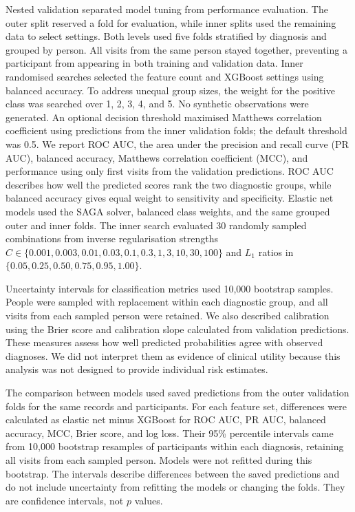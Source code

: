 \documentclass[referee,pdflatex,sn-vancouver-num]{sn-jnl}
\begin{document}
Nested validation separated model tuning from performance evaluation. The
outer split reserved a fold for evaluation, while inner splits used the
remaining data to select settings. Both levels used five folds stratified by
diagnosis and grouped by person. All visits from the same person stayed
together, preventing a participant from appearing in both training and
validation data. Inner randomised searches selected the feature count and
XGBoost settings using balanced accuracy. To address unequal group sizes,
the weight for the positive class was searched over 1, 2, 3, 4, and 5.
No synthetic observations were generated. An optional decision threshold
maximised Matthews correlation coefficient using predictions from the inner
validation folds; the default threshold was 0.5. We report ROC AUC, the area under
the precision and recall curve (PR AUC), balanced accuracy, Matthews correlation coefficient (MCC), and
performance using only first visits from the validation predictions. ROC AUC
describes how well the predicted scores rank the two diagnostic groups, while
balanced accuracy gives equal weight to sensitivity and specificity. Elastic net models
used the SAGA solver, balanced class weights, and the same grouped outer and
inner folds. The inner search evaluated 30 randomly sampled combinations from
inverse regularisation strengths $C\in\{0.001,0.003,0.01,0.03,0.1,0.3,1,3,
10,30,100\}$ and $L_1$ ratios in $\{0.05,0.25,0.50,0.75,0.95,1.00\}$.

Uncertainty intervals for classification metrics used 10,000 bootstrap
samples. People were sampled with replacement within each diagnostic group,
and all visits from each sampled person were retained. We also described
calibration using the Brier score and calibration slope calculated from
validation predictions. These measures assess how well predicted probabilities
agree with observed diagnoses. We did not interpret them as evidence of clinical
utility because this analysis was not designed to provide individual risk estimates.

The comparison between models used saved predictions from the outer validation
folds for the same records and participants. For each feature set, differences
were calculated as elastic net minus XGBoost for ROC AUC, PR AUC, balanced accuracy,
MCC, Brier score, and log loss. Their 95\% percentile intervals came from
10,000 bootstrap resamples of participants within each diagnosis, retaining
all visits from each sampled person. Models were not refitted during this
bootstrap. The intervals describe differences between the saved predictions
and do not include uncertainty from refitting the models or changing the folds.
They are confidence intervals, not $p$ values.
\end{document}
